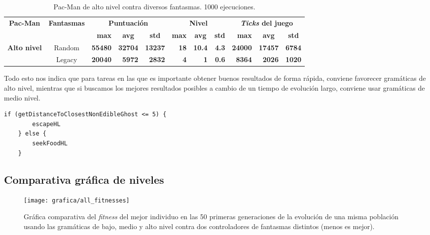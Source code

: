 \begin{sidewaystable}[]
\centering
\begin{tabular}{|l|c|r|r|r|r|r|r|r|r|r|}
\hline
\multicolumn{1}{|c|}{\multirow{2}{*}{\textbf{Pac-Man}}} & \multirow{2}{*}{\textbf{Fantasmas}} & \multicolumn{3}{c|}{\textbf{Puntuación}} & \multicolumn{3}{c|}{\textbf{Nivel}} & \multicolumn{3}{c|}{\textbf{\textit{Ticks} del juego}} \\ \cline{3-11} 
\multicolumn{1}{|c|}{} &  & \textbf{max} & \multicolumn{1}{c|}{\textbf{avg}} & \multicolumn{1}{c|}{\textbf{std}} & \textbf{max} & \multicolumn{1}{c|}{\textbf{avg}} & \multicolumn{1}{c|}{\textbf{std}} & \textbf{max} & \multicolumn{1}{c|}{\textbf{avg}} & \multicolumn{1}{c|}{\textbf{std}} \\ \hline
\multirow{2}{*}{\textbf{Alto nivel}} & Random & \multicolumn{1}{r|}{\textbf{55480}} & \textbf{32704} & \textbf{13237} & \multicolumn{1}{r|}{\textbf{18}} & \textbf{10.4} & \textbf{4.3} & \multicolumn{1}{r|}{\textbf{24000}} & \textbf{17457} & \textbf{6784} \\ \cline{2-11} 
 & Legacy & \multicolumn{1}{r|}{\textbf{20040}} & \textbf{5972} & \textbf{2832} & \multicolumn{1}{r|}{\textbf{4}} & \textbf{1} & \textbf{0.6} & \multicolumn{1}{r|}{\textbf{8364}} & \textbf{2026} & \textbf{1020} \\ \hline
\end{tabular}
\caption{Pac-Man de alto nivel contra diversos fantasmas. 1000 ejecuciones.}
\label{table:single_obj_high}
\end{sidewaystable}

Todo esto nos indica que para tareas en las que es importante obtener buenos resultados de forma rápida, conviene favorecer gramáticas de alto nivel, mientras que si buscamos los mejores resultados posibles a cambio de un tiempo de evolución largo, conviene usar gramáticas de medio nivel.

\begin{lstlisting}[caption={Ejemplo de bot producido al evolucionar usando la gramática de alto nivel (mismo resultado entrenando tanto contra Random Ghosts como Legacy Ghosts).}]
    if (getDistanceToClosestNonEdibleGhost <= 5) {
        escapeHL
    } else {
        seekFoodHL
    }
\end{lstlisting}

\subsection{Comparativa gráfica de niveles}
\begin{figure}[H]
\centering
\texttt{[image: grafica/all\_fitnesses]}
\label{grafica:comparacion-todas}
\caption{Gráfica comparativa del \textit{fitness} del mejor individuo en las 50 primeras generaciones de la evolución de una misma población usando las gramáticas de bajo, medio y alto nivel contra dos controladores de fantasmas distintos (menos es mejor).}
\end{figure}

